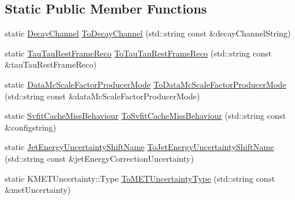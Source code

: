 \subsection*{Static Public Member Functions}
\begin{DoxyCompactItemize}
\item 
static \hyperlink{classHttEnumTypes_a5e7e80b023df2c06dfd1e9c08f6efb35}{DecayChannel} \hyperlink{classHttEnumTypes_a3c7b9fab8510ad33cafc5f890909c127}{ToDecayChannel} (std::string const \&decayChannelString)
\item 
static \hyperlink{classHttEnumTypes_add21b4b1cefbea05ecb244d1b72f52e7}{TauTauRestFrameReco} \hyperlink{classHttEnumTypes_a26521ff02e7d84f64cd4d39bcea272b1}{ToTauTauRestFrameReco} (std::string const \&tauTauRestFrameReco)
\item 
static \hyperlink{classHttEnumTypes_a0185dcc829ec5820485e1742529a4435}{DataMcScaleFactorProducerMode} \hyperlink{classHttEnumTypes_abe7f692e07853746cabcc3aeb42ef2a2}{ToDataMcScaleFactorProducerMode} (std::string const \&dataMcScaleFactorProducerMode)
\item 
static \hyperlink{classHttEnumTypes_a51f8f038c31766e1b929398fa2239dcd}{SvfitCacheMissBehaviour} \hyperlink{classHttEnumTypes_acd2f5cc27dc531e0939477f638f90ac5}{ToSvfitCacheMissBehaviour} (std::string const \&configstring)
\item 
static \hyperlink{classHttEnumTypes_a6d52b15105995df93610454d88c598f0}{JetEnergyUncertaintyShiftName} \hyperlink{classHttEnumTypes_a82c461652277ddc65ef035985ff5066d}{ToJetEnergyUncertaintyShiftName} (std::string const \&jetEnergyCorrectionUncertainty)
\item 
static KMETUncertainty::Type \hyperlink{classHttEnumTypes_a1e57ba49f33662a1f03ce1204bded48a}{ToMETUncertaintyType} (std::string const \&metUncertainty)
\end{DoxyCompactItemize}


